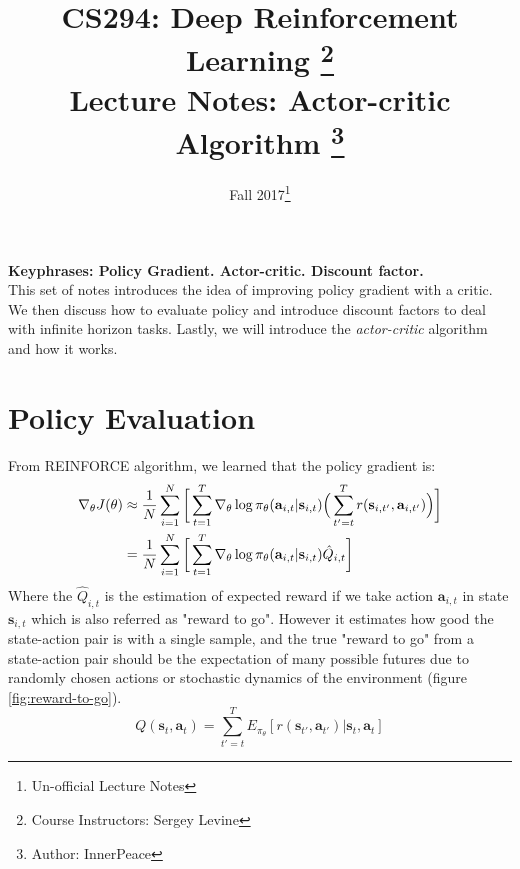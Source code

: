 \documentclass{tufte-handout}
\title{CS294: Deep Reinforcement Learning
       \thanks{Course Instructors: Sergey Levine} \\
       \Large Lecture Notes: Actor-critic Algorithm \thanks{Author: InnerPeace}}
\date{Fall 2017\thanks{Un-official Lecture Notes}} %
\newcommand{\s}{\mathbf{s}}
\newcommand{\act}{\mathbf{a}}
\begin{document}
\maketitle%

\textbf{Keyphrases: Policy Gradient. Actor-critic. Discount factor. }\\

\noindent{}This set of notes introduces the idea of improving policy gradient with a critic. We then discuss how to evaluate policy and introduce discount factors to deal with infinite horizon tasks. Lastly, we will introduce the \emph{actor-critic} algorithm and how it works.

\section{Policy Evaluation}
From REINFORCE algorithm, we learned that the policy gradient is:
\begin{align}
\label{eq:1}
\nabla _\theta J(\theta) & \approx \frac{1}{N} \sum_{i=1} ^ {N} \bigg[\sum_{t=1}^T \nabla_\theta \log \pi_\theta(\act_{i,t}| \s_{i,t})
  \Big( \sum_{t'=t}^T r(\s_{i, t'}, \act_{i, t'}) \Big) \bigg] \notag \\
  & = \frac{1}{N} \sum_{i=1} ^ {N} \bigg[\sum_{t=1}^T \nabla_\theta \log \pi_\theta(\act_{i,t}| \s_{i,t})
  \hat{Q}_{i,t} \bigg]
\end{align}
Where the $\hat{Q}_{i,t}$ is the estimation of expected reward if we take action $\act_{i,t}$ in state $\s_{i,t}$ which is also referred as
"reward to go". However it estimates how good the state-action pair is with a single sample, and the true "reward to go" from a state-action pair should
be the expectation of many possible futures due to randomly chosen actions or stochastic dynamics of the environment (figure \ref{fig:reward-to-go}).
\begin{equation}
\label{eq:2}
Q(\s_t, \act_t) = \sum_{t' = t} ^ T E_{\pi_\theta} [r(\s_{t'}, \act_{t'}) | \s_t, \act_t]
\end{equation}
\end{document}
